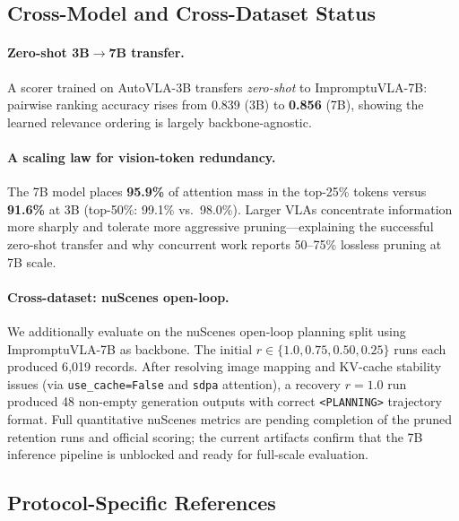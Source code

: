 \documentclass[letterpaper]{article} %
\begin{document}
\subsection{Cross-Model and Cross-Dataset Status}
\label{sec:gen}

\paragraph{Zero-shot 3B$\to$7B transfer.}
A scorer trained on AutoVLA-3B transfers \emph{zero-shot} to ImpromptuVLA-7B:
pairwise ranking accuracy rises from 0.839 (3B) to \textbf{0.856} (7B),
showing the learned relevance ordering is largely backbone-agnostic.

\paragraph{A scaling law for vision-token redundancy.}
The 7B model places \textbf{95.9\%} of attention mass in the top-25\% tokens
versus \textbf{91.6\%} at 3B (top-50\%: 99.1\% vs.\ 98.0\%).
Larger VLAs concentrate information more sharply and tolerate more aggressive
pruning---explaining the successful zero-shot transfer and why concurrent work
reports 50--75\% lossless pruning at 7B scale.

\paragraph{Cross-dataset: nuScenes open-loop.}
We additionally evaluate \ours{} on the nuScenes open-loop planning split using
ImpromptuVLA-7B as backbone. The initial $r\in\{1.0,0.75,0.50,0.25\}$ runs
each produced 6{,}019 records. After resolving image mapping and KV-cache
stability issues (via \texttt{use\_cache=False} and \texttt{sdpa} attention),
a recovery $r{=}1.0$ run produced 48 non-empty generation outputs with correct
\texttt{<PLANNING>} trajectory format. Full quantitative nuScenes metrics are
pending completion of the pruned retention runs and official scoring; the
current artifacts confirm that the 7B inference pipeline is unblocked and ready
for full-scale evaluation.

\subsection{Protocol-Specific References}
\label{sec:ablation}
\end{document}
